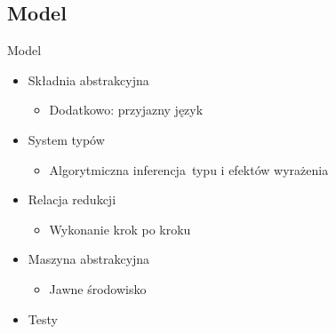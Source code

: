 \documentclass{beamer}
\begin{document}
\subsection{Model}
\begin{frame}{Model}
  \begin{itemize}
    \item Składnia abstrakcyjna
    \begin{itemize}
      \item Dodatkowo: przyjazny język
    \end{itemize}
    \item System typów
    \begin{itemize}
      \item Algorytmiczna inferencja typu i efektów wyrażenia
    \end{itemize}
    \item Relacja redukcji
    \begin{itemize}
      \item Wykonanie krok po kroku
    \end{itemize}
    \item Maszyna abstrakcyjna
    \begin{itemize}
      \item Jawne środowisko
    \end{itemize}
    \item Testy
  \end{itemize}
\end{frame}


\end{document}
